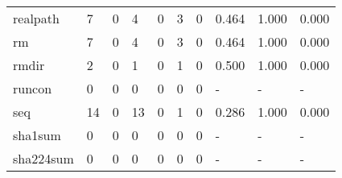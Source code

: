 \begin{longtable}{lp{2.0cm}p{2.0cm}p{2.0cm}p{2.0cm}p{2.0cm}p{2.0cm}p{2.0cm}p{2.0cm}p{2.0cm}}
realpath  &                      7 &                                  0 &                                 4 &                                0 &                                 3 &                               0 &                                0.464 &                                  1.000 &                                0.000 \\
rm        &                      7 &                                  0 &                                 4 &                                0 &                                 3 &                               0 &                                0.464 &                                  1.000 &                                0.000 \\
rmdir     &                      2 &                                  0 &                                 1 &                                0 &                                 1 &                               0 &                                0.500 &                                  1.000 &                                0.000 \\
runcon    &                      0 &                                  0 &                                 0 &                                0 &                                 0 &                               0 &                                    - &                                      - &                                    - \\
seq       &                     14 &                                  0 &                                13 &                                0 &                                 1 &                               0 &                                0.286 &                                  1.000 &                                0.000 \\
sha1sum   &                      0 &                                  0 &                                 0 &                                0 &                                 0 &                               0 &                                    - &                                      - &                                    - \\
sha224sum &                      0 &                                  0 &                                 0 &                                0 &                                 0 &                               0 &                                    - &                                      - &                                    - \\

\end{longtable}
